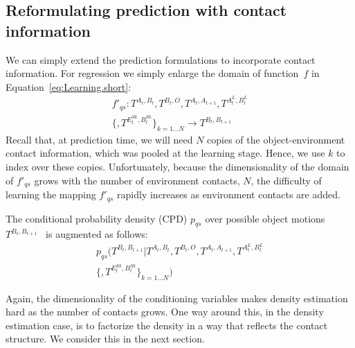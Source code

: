 \subsection{Reformulating prediction with contact information}
We can simply extend the prediction formulations to incorporate contact information. For regression we simply enlarge the domain of function~$f$
in Equation~\eqref{eq:Learning.short}:
\begin{multline}
f'_{qs}: T^{A_t, B_t}, T^{B_t, O}, T^{A_{t}, A_{t+1}}, T^{A^{L}_t, B^{L}_t} \\ \{, T^{E^{Sk}_t,B^{Sk}_t}\}_{k=1 \ldots N} \longrightarrow T^{B_{t}, B_{t+1}}
\label{eq:Learning.augmented}
\end{multline}
Recall that, at prediction time, we will need $N$ copies of the object-environment contact information, which was pooled at the learning stage. Hence, we use $k$ to index over these copies. Unfortunately, because the dimensionality of the domain of $f'_{qs}$ grows with the number of environment contacts, $N$, the difficulty of learning the mapping $f'_{qs}$ rapidly increases as environment contacts are added.

The conditional probability density (CPD) $p_{qs}$ over possible object motions $T^{B_{t}, B_{t+1}}$~\citep{kopicki_prediction_2009} is augmented as follows:
\begin{multline}
p_{qs}(T^{B_{t}, B_{t+1}} | T^{A_t, B_t}, T^{B_t, O}, T^{A_{t}, A_{t+1}}, T^{A^{L}_t, B^{L}_t} \\ \{, T^{E^{Sk}_t,B^{Sk}_t}\}_{k=1 \ldots N})
\label{eq:Learning.density}
\end{multline}

Again, the dimensionality of the conditioning variables makes density estimation hard as the number of contacts grows. One way around this, in the density estimation case, is to factorize the density in a way that reflects the contact structure. We consider this in the next section.